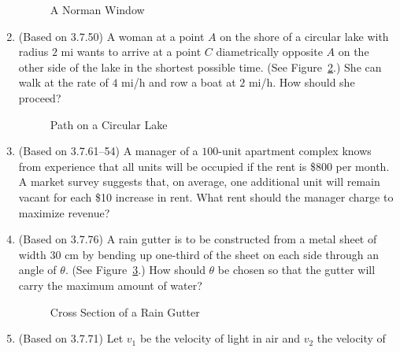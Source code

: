 \documentclass{article}
\begin{document}
\begin{enumerate}
\begin{figure}[htbp]
    \caption{A Norman Window}
    \label{fig:norman}
  \end{figure}
\item (Based on 3.7.50) %
  A woman at a point $A$ on the shore of a circular lake with radius
  $2$ mi wants to arrive at a point $C$ diametrically opposite $A$ on
  the other side of the lake in the shortest possible time.  (See
  Figure~\ref{fig:lake}.)  She can walk at the rate of $4$ mi/h and
  row a boat at $2$ mi/h.  How should she proceed?
  \begin{figure}[htbp]
    \centering
    \caption{Path on a Circular Lake}
    \label{fig:lake}
  \end{figure}
\item (Based on 3.7.61--54) %
  A manager of a $100$-unit apartment complex knows from experience
  that all units will be occupied if the rent is \$800 per month.  A
  market survey suggests that, on average, one additional unit will
  remain vacant for each \$10 increase in rent.  What rent should the
  manager charge to maximize revenue?
\item (Based on 3.7.76) %
  A rain gutter is to be constructed from a metal sheet of width $30$
  cm by bending up one-third of the sheet on each side through an
  angle of $\theta$.  (See Figure~\ref{fig:gutter}.)  How should
  $\theta$ be chosen so that the gutter will carry the maximum amount
  of water?
  \begin{figure}[htbp]
    \centering
    \caption{Cross Section of a Rain Gutter}
    \label{fig:gutter}
  \end{figure}
\item (Based on 3.7.71)
  Let $v_1$ be the velocity of light in air and $v_2$ the velocity of

\end{enumerate}
\end{document}

